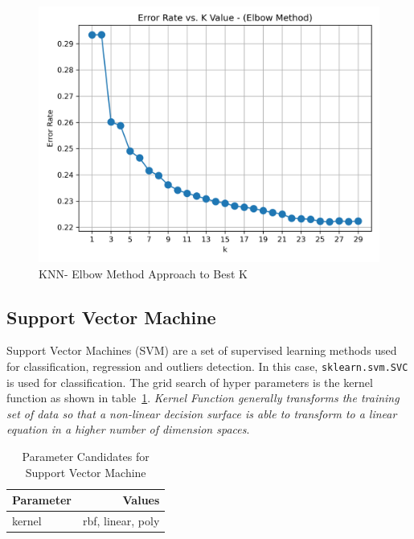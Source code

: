 \begin{figure}
    \centering
    \includegraphics[width=1\linewidth]{docs//assets/elbow_method_knn.png}
    \caption{KNN- Elbow Method Approach to Best K}
    \label{fig:knn-elbow}
\end{figure}


\subsection{Support Vector Machine}

Support Vector Machines (SVM) are a set of supervised learning methods used for classification, regression and outliers detection. In this case, \texttt{sklearn.svm.SVC} is used for classification. The grid search of hyper parameters is the kernel function as shown in table~\ref{tab:parameters-svm}. \textit{Kernel Function generally transforms the training set of data so that a non-linear decision surface is able to transform to a linear equation in a higher number of dimension spaces}\cite{geeksforgeeks_kernel_svm}. 

\begin{table}[h]
\centering
\begin{tabular}{|l|r|}
\hline
\textbf{Parameter} & \textbf{Values}        \\ \hline
kernel             & rbf, linear, poly      \\ \hline
\end{tabular}
\caption{Parameter Candidates for Support Vector Machine}
\label{tab:parameters-svm}
\end{table}

